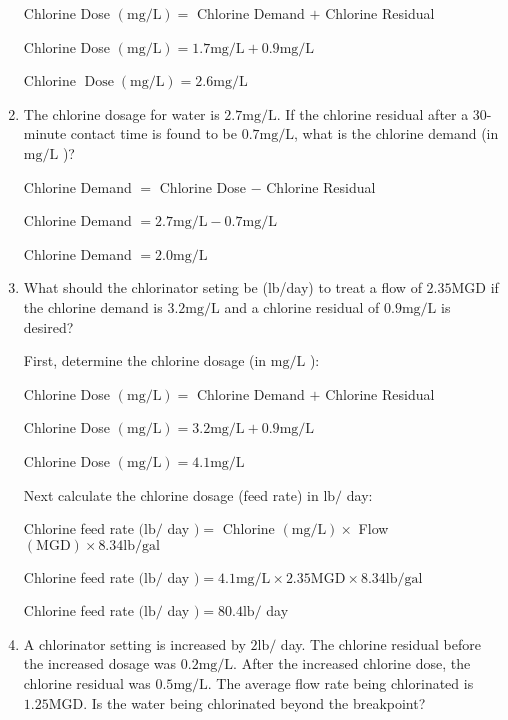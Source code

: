 \documentclass{article}
\begin{document}
\begin{enumerate}
Chlorine Dose $(\mathrm{mg} / \mathrm{L})=$ Chlorine Demand $+$ Chlorine Residual

Chlorine Dose $(\mathrm{mg} / \mathrm{L})=1.7 \mathrm{mg} / \mathrm{L}+0.9 \mathrm{mg} / \mathrm{L}$

Chlorine $\operatorname{Dose}(\mathrm{mg} / \mathrm{L})=2.6 \mathrm{mg} / \mathrm{L}$

\item The chlorine dosage for water is $2.7 \mathrm{mg} / \mathrm{L}$. If the chlorine residual after a 30-minute contact time is found to be $0.7 \mathrm{mg} / \mathrm{L}$, what is the chlorine demand (in $\mathrm{mg} / \mathrm{L}$ )?

Chlorine Demand $=$ Chlorine Dose $-$ Chlorine Residual

Chlorine Demand $=2.7 \mathrm{mg} / \mathrm{L}-0.7 \mathrm{mg} / \mathrm{L}$

Chlorine Demand $=2.0 \mathrm{mg} / \mathrm{L}$

\item What should the chlorinator seting be (lb/day) to treat a flow of $2.35 \mathrm{MGD}$ if the chlorine demand is $3.2 \mathrm{mg} / \mathrm{L}$ and a chlorine residual of $0.9 \mathrm{mg} / \mathrm{L}$ is desired?

First, determine the chlorine dosage (in $\mathrm{mg} / \mathrm{L}$ ):

Chlorine Dose $(\mathrm{mg} / \mathrm{L})=$ Chlorine Demand $+$ Chlorine Residual

Chlorine Dose $(\mathrm{mg} / \mathrm{L})=3.2 \mathrm{mg} / \mathrm{L}+0.9 \mathrm{mg} / \mathrm{L}$

Chlorine Dose $(\mathrm{mg} / \mathrm{L})=4.1 \mathrm{mg} / \mathrm{L}$

Next calculate the chlorine dosage (feed rate) in $\mathrm{lb} /$ day:

Chlorine feed rate $(\mathrm{lb} /$ day $)=$ Chlorine $(\mathrm{mg} / \mathrm{L}) \times$ Flow $(\mathrm{MGD}) \times 8.34 \mathrm{lb} / \mathrm{gal}$

Chlorine feed rate $(\mathrm{lb} /$ day $)=4.1 \mathrm{mg} / \mathrm{L} \times 2.35 \mathrm{MGD} \times 8.34 \mathrm{lb} / \mathrm{gal}$

Chlorine feed rate $(\mathrm{lb} /$ day $)=80.4 \mathrm{lb} /$ day


\item A chlorinator setting is increased by $2 \mathrm{lb} /$ day. The chlorine residual before the increased dosage was $0.2 \mathrm{mg} / \mathrm{L}$. After the increased chlorine dose, the chlorine residual was $0.5 \mathrm{mg} / \mathrm{L}$. The average flow rate being chlorinated is $1.25 \mathrm{MGD}$. Is the water being chlorinated beyond the breakpoint?


\end{enumerate}
\end{document}
